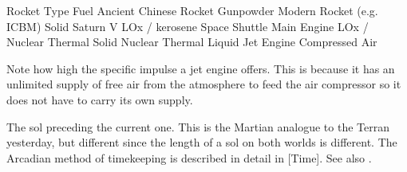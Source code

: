 {
    \bTABLE[split=repeat,option=stretch]%
    \setupTABLE[row][each][align=center]

    \bTABLEhead
    \bTR
      \bTH Rocket Type \eTH
      \bTH Fuel \eTH
      \bTH {} \eTH
    \eTR
    \eTABLEhead
    \bTABLEbody
    \bTR
      \bTC Ancient Chinese Rocket \eTC
      \bTC Gunpowder \eTC
       \eTC
    \eTR
    \bTR
      \bTC Modern Rocket (e.g. ICBM) \eTC
      \bTC Solid \eTC
       \eTC
    \eTR
    \bTR
      \bTC Saturn V \eTC
      \bTC LOx / kerosene \eTC
       \eTC
    \eTR
    \bTR
      \bTC Space Shuttle Main Engine \eTC
      \bTC LOx /  \eTC
       \eTC
    \eTR
    \bTR
      \bTC Nuclear Thermal \eTC
      \bTC Solid \eTC
       \eTC
    \eTR
    \bTR
      \bTC Nuclear Thermal \eTC
      \bTC Liquid \eTC
       \eTC
    \eTR
    \bTR
      \bTC Jet Engine \eTC
      \bTC Compressed Air \eTC
       \eTC
    \eTR
\eTABLEbody
\eTABLE
}

Note how high the specific impulse a jet engine offers. This is because it has an unlimited supply of free air from the atmosphere to feed the air compressor so it does not have to carry its own supply.

The sol preceding the current one. This is the Martian analogue to the Terran yesterday, but different since the length of a sol on both worlds is different. The Arcadian method of timekeeping is described in detail in [Time]. See also \about[Sol].

\StopChapter

